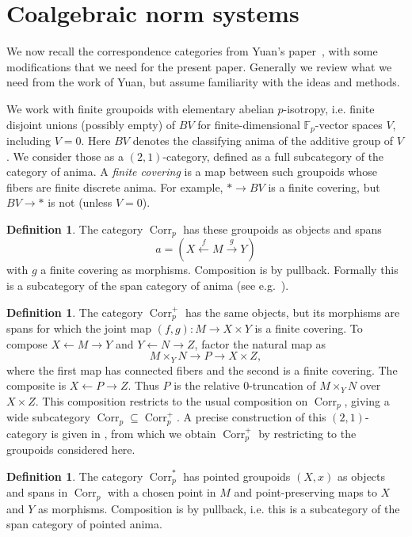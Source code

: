 \documentclass[11pt,a4paper]{article}
\theoremstyle{definition}
\newtheorem{defn}[thm]{Definition}
\newcommand{\Fp}{\mathbb F_p}
\newcommand{\Corr}{\operatorname{Corr}_p}
\begin{document}
\section{Coalgebraic norm systems}\label{sec:norm-systems}

We now recall the correspondence categories from Yuan's paper~\cite{Yuan},
with some modifications that we need for the present paper. Generally we review what we need from the work of Yuan, but assume familiarity with the ideas and methods. 



We work with finite groupoids with elementary abelian $p$-isotropy,
i.e. finite disjoint unions (possibly empty) of $BV$ for
finite-dimensional $\Fp$-vector spaces $V$, including $V=0$.
Here $BV$ denotes the classifying anima of the additive group of $V$.
We consider those as a $(2,1)$-category, defined as a full subcategory of the category of anima. 
A \emph{finite covering}
is a map between such groupoids whose fibers are finite discrete anima. For example,
$*\to BV$ is a finite covering, but $BV\to *$ is not (unless $V=0$).

\begin{defn}\label{def:corr}
The category $\Corr$ has these groupoids as objects and spans
\[
 a=(X\xleftarrow{f}M\xrightarrow{g}Y)
\]
with $g$ a finite covering
as morphisms. Composition is by  pullback. Formally this is a  subcategory of the span category of anima (see e.g.\ \cite[\S2]{CLR}). 
\end{defn}

\begin{defn}\label{def:corr-plus}
The category $\Corr^{+}$ has the same objects, but its morphisms are
spans for which the joint map $(f,g):M\to X\times Y$ is a finite
covering. To compose $X\leftarrow M\to Y$ and $Y\leftarrow N\to Z$,
factor the natural map as
\[
 M\times_Y N\longrightarrow P\longrightarrow X\times Z,
\]
where the first map has connected fibers and the second
is a finite covering. The composite is $X\leftarrow P\to Z$.
Thus $P$ is the relative $0$-truncation of $M\times_Y N$ over
$X\times Z$. This composition restricts to the usual composition
on $\Corr$, giving a wide subcategory $\Corr\subseteq\Corr^{+}$.
A precise construction of this $(2,1)$-category is given in
\cite[Definition~2.13 and Convention~2.17]{Yuan}, from which we obtain
$\Corr^{+}$ by restricting to the groupoids considered here.
\end{defn}

\begin{defn}\label{def:corr-pointed}
The category $\Corr^{*}$ has pointed groupoids $(X,x)$ as objects
and spans in $\Corr$ with a chosen point in $M$ and point-preserving
maps to $X$ and $Y$ as morphisms. Composition is by
pullback, i.e. this is a subcategory of the span category of pointed anima.
\end{defn}
\end{document}
